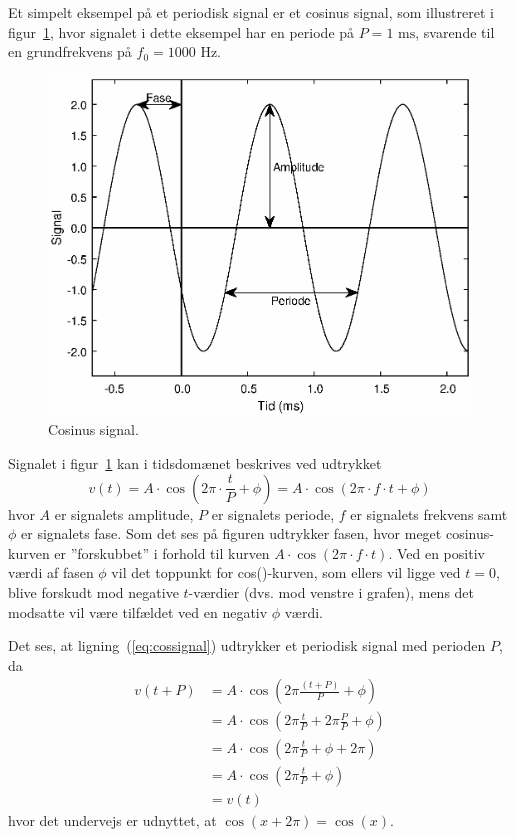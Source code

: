 \documentclass[11pt,a4paper]{article}
\begin{document}
Et simpelt eksempel på et periodisk signal er et cosinus signal, som illustreret i figur~\ref{fig:cos}, hvor signalet i dette eksempel har en periode på $P=1\textrm{ ms}$, svarende til en grundfrekvens på $f_0=1000\textrm{ Hz}$.
\begin{figure}[htbp]
\centering
\includegraphics[scale=0.7]{cossignal}
\caption{\label{fig:cos}Cosinus signal.}
\end{figure}

\noindent{}Signalet i figur~\ref{fig:cos} kan i tidsdomænet beskrives ved udtrykket
\begin{equation}\label{eq:cossignal}
v(t) = A\cdot{}\cos\left(2\pi\cdot\frac{t}{P}+\phi\right) = A\cdot{}\cos\left(2\pi\cdot{}f\cdot{}t+\phi\right)
\end{equation}
\noindent{}hvor $A$ er signalets amplitude, $P$ er signalets periode, $f$ er signalets frekvens samt $\phi$ er signalets fase. Som det ses på figuren udtrykker fasen, hvor meget cosinus-kurven er ''forskubbet'' i forhold til kurven $A\cdot{}\cos\left(2\pi\cdot{}f\cdot{}t\right)$. Ved en positiv værdi af fasen $\phi$ vil det toppunkt for cos()-kurven, som ellers vil ligge ved $t=0$, blive forskudt mod negative $t$-værdier (dvs. mod venstre i grafen), mens det modsatte vil være tilfældet ved en negativ $\phi$ værdi.

Det ses, at ligning~(\ref{eq:cossignal}) udtrykker et periodisk signal med perioden $P$, da
\begin{align*}
v(t + P) &= A\cdot{}\cos\left(2\pi\frac{(t+P)}{P}+\phi\right) \nonumber\\
         &= A\cdot{}\cos\left(2\pi\frac{t}{P}+2\pi\frac{P}{P}+\phi\right) \nonumber\\
         &= A\cdot{}\cos\left(2\pi\frac{t}{P}+\phi+2\pi\right) \nonumber\\
         &= A\cdot{}\cos\left(2\pi\frac{t}{P}+\phi\right) \nonumber\\
         &= v(t)
\end{align*}
\noindent{}hvor det undervejs er udnyttet, at $\cos(x+2\pi{})=\cos(x)$.
\end{document}
